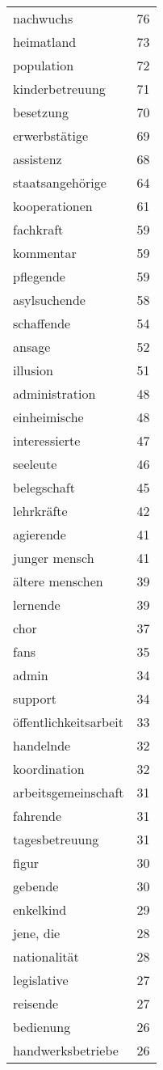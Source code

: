 \begin{tabular}{ll}
nachwuchs & 76\\
heimatland & 73\\
population & 72\\
kinderbetreuung & 71\\
besetzung & 70\\
erwerbstätige & 69\\
assistenz & 68\\
staatsangehörige & 64\\
kooperationen & 61\\
fachkraft & 59\\
kommentar & 59\\
pflegende & 59\\
asylsuchende & 58\\
schaffende & 54\\
ansage & 52\\
illusion & 51\\
administration & 48\\
einheimische & 48\\
interessierte & 47\\
seeleute & 46\\
belegschaft & 45\\
lehrkräfte & 42\\
agierende & 41\\
junger mensch & 41\\
ältere menschen & 39\\
lernende & 39\\
chor & 37\\
fans & 35\\
admin & 34\\
support & 34\\
öffentlichkeitsarbeit & 33\\
handelnde & 32\\
koordination & 32\\
arbeitsgemeinschaft & 31\\
fahrende & 31\\
tagesbetreuung & 31\\
figur & 30\\
gebende & 30\\
enkelkind & 29\\
jene, die & 28\\
nationalität & 28\\
legislative & 27\\
reisende & 27\\
bedienung & 26\\
handwerksbetriebe & 26\\

\end{tabular}
